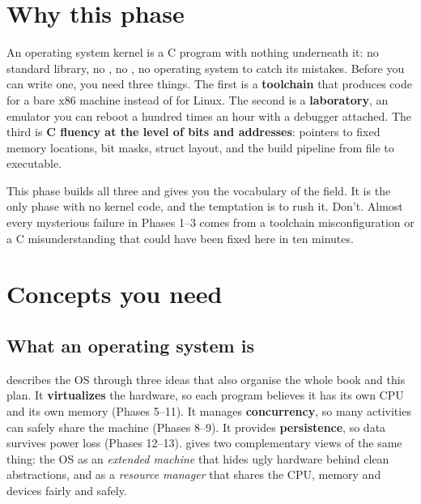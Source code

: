 \documentclass[11pt,a4paper]{article}
\begin{document}


\section{Why this phase}

An operating system kernel is a C program with nothing underneath it: no standard library, no , no
, no operating system to catch its mistakes. Before you can write one, you need three things. The first
is a \textbf{toolchain} that produces code for a bare x86 machine instead of for Linux. The second is a
\textbf{laboratory}, an emulator you can reboot a hundred times an hour with a debugger attached. The third is
\textbf{C fluency at the level of bits and addresses}: pointers to fixed memory locations, bit masks, struct layout,
and the build pipeline from  file to executable.

This phase builds all three and gives you the vocabulary of the field. It is the only phase with no kernel code, and
the temptation is to rush it. Don't. Almost every mysterious failure in Phases 1--3 comes from a toolchain
misconfiguration or a C misunderstanding that could have been fixed here in ten minutes.

\section{Concepts you need}

\subsection{What an operating system is}

\OSTEP describes the OS through three ideas that also organise the whole book and this plan. It
\textbf{virtualizes} the hardware, so each program believes it has its own CPU and its own memory (Phases 5--11). It
manages \textbf{concurrency}, so many activities can safely share the machine (Phases 8--9). It provides
\textbf{persistence}, so data survives power loss (Phases 12--13). \MOS gives two complementary views of the same
thing: the OS as an \emph{extended machine} that hides ugly hardware behind clean abstractions, and as a
\emph{resource manager} that shares the CPU, memory and devices fairly and safely.
\end{document}
